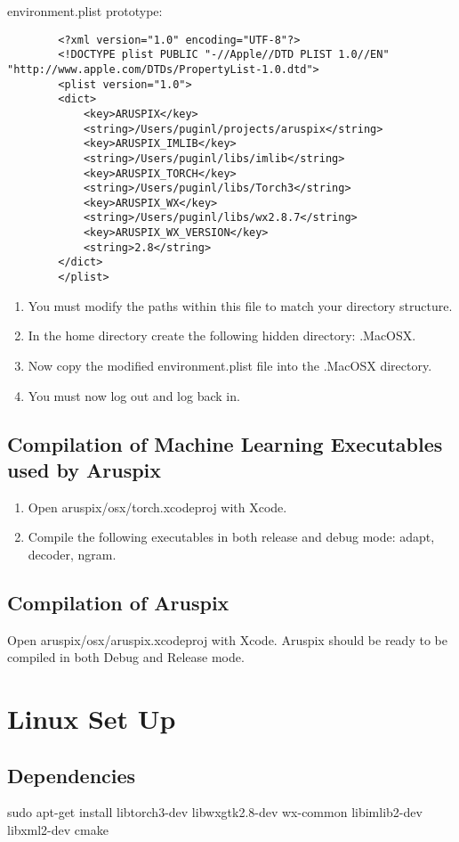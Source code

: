 \documentclass[]{article}
\begin{document}
	environment.plist prototype:
	\begin{verbatim}
		<?xml version="1.0" encoding="UTF-8"?>
		<!DOCTYPE plist PUBLIC "-//Apple//DTD PLIST 1.0//EN" "http://www.apple.com/DTDs/PropertyList-1.0.dtd">
		<plist version="1.0">
		<dict>
		    <key>ARUSPIX</key>
		    <string>/Users/puginl/projects/aruspix</string>
		    <key>ARUSPIX_IMLIB</key>
		    <string>/Users/puginl/libs/imlib</string>
		    <key>ARUSPIX_TORCH</key>
		    <string>/Users/puginl/libs/Torch3</string>
		    <key>ARUSPIX_WX</key>
		    <string>/Users/puginl/libs/wx2.8.7</string>
		    <key>ARUSPIX_WX_VERSION</key>
		    <string>2.8</string>
		</dict>
		</plist>
	\end{verbatim}
	\begin{enumerate}
		\item You must modify the paths within this file to match your directory structure.
		\item In the home directory create the following hidden directory: .MacOSX.
		\item Now copy the modified environment.plist file into the .MacOSX directory.
		\item You must now log out and log back in.
	\end{enumerate}
	
\subsection{Compilation of Machine Learning Executables used by Aruspix}
	\begin{enumerate}
		\item Open aruspix/osx/torch.xcodeproj with Xcode.
		\item Compile the following executables in both release and debug mode: adapt, decoder, ngram.
	\end{enumerate}

\subsection{Compilation of Aruspix}
Open aruspix/osx/aruspix.xcodeproj with Xcode.
Aruspix should be ready to be compiled in both Debug and Release mode. 

\section{Linux Set Up}

\subsection{Dependencies}
 sudo apt-get install libtorch3-dev libwxgtk2.8-dev wx-common libimlib2-dev libxml2-dev cmake
\end{document}
